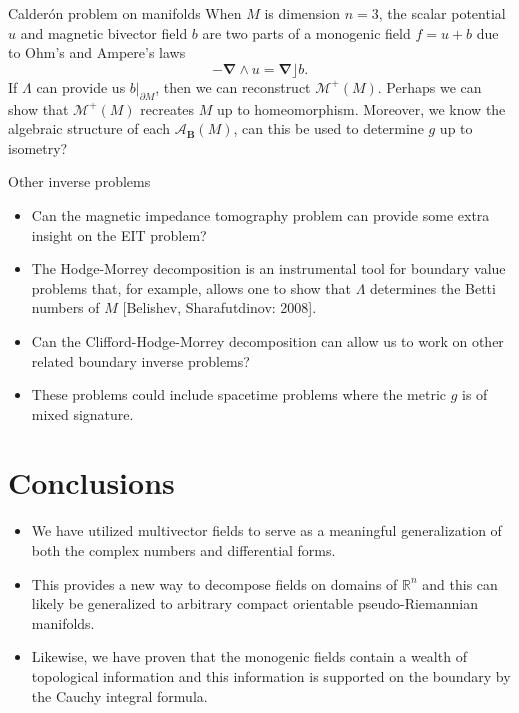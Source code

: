 \documentclass[aspectratio=169,handout]{beamer}
\newcommand{\R}{\mathbb{R}}
\newcommand{\algebra}{\mathcal{A}}
\newcommand{\grad}{\boldsymbol{\nabla}}
\newcommand{\blade}[1]{\boldsymbol{#1}}
\newcommand{\boundary}{{\partial M}}
\newcommand{\monogenicfields}[1]{\mathcal{M}^{#1}(M)}
\newcommand{\bivector}{\blade{B}}
\begin{document}
\begin{frame}{Calder\'on problem on manifolds}
\vfill
When $M$ is dimension $n=3$, the scalar potential $u$ and magnetic bivector field $b$ are two parts of a monogenic field $f=u+b$ due to Ohm's and Ampere's laws 
\[
-\grad \wedge u = \grad \rfloor b.
\] 
If $\Lambda$ can provide us $b\vert_\boundary$, then we can reconstruct $\monogenicfields{+}$. Perhaps we can show that $\monogenicfields{+}$ recreates $M$ up to homeomorphism. Moreover, we know the algebraic structure of each $\algebra_{\bivector}(M)$, can this be used to determine $g$ up to isometry?
\vfill
\end{frame}

\begin{frame}{Other inverse problems}
\vfill
\begin{itemize}
    \item Can the magnetic impedance tomography problem can provide some extra insight on the EIT problem?
    \item The Hodge-Morrey decomposition is an instrumental tool for boundary value problems that, for example, allows one to show that $\Lambda$ determines the Betti numbers of $M$ [Belishev, Sharafutdinov: 2008].
    \item Can the Clifford-Hodge-Morrey decomposition can allow us to work on other related boundary inverse problems? 
    \item These problems could include spacetime problems where the metric $g$ is of mixed signature.
\end{itemize}
\vfill
\end{frame}

\section{Conclusions}

\begin{frame}{}
\vfill
\begin{itemize}
    \item We have utilized multivector fields to serve as a meaningful generalization of both the complex numbers and differential forms. 
    \item This provides a new way to decompose fields on domains of $\R^n$ and this can likely be generalized to arbitrary compact orientable pseudo-Riemannian manifolds.
    \item Likewise, we have proven that the monogenic fields contain a wealth of topological information and this information is supported on the boundary by the Cauchy integral formula.
\end{itemize}
\vfill
\end{frame}
\end{document}
